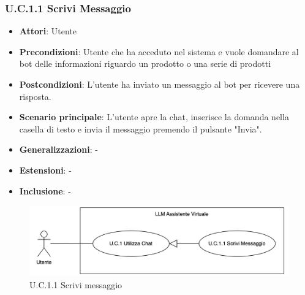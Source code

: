 \subsubsection{U.C.1.1 Scrivi Messaggio}
\begin{itemize}
    \item \textbf{Attori}: Utente
    \item \textbf{Precondizioni}: Utente che ha acceduto nel sistema e vuole domandare al bot delle informazioni riguardo un prodotto o una serie di prodotti
    \item \textbf{Postcondizioni}: L'utente ha inviato un messaggio al bot per ricevere una risposta.
    \item \textbf{Scenario principale}: L'utente apre la chat, inserisce la domanda nella casella di testo e invia il messaggio premendo il pulsante "Invia".
    \item \textbf{Generalizzazioni}: -
    \item \textbf{Estensioni}: -
    \item \textbf{Inclusione}: -
\end{itemize}
\begin{figure}[H]
    \centering
    \includegraphics[width=\textwidth]{img/UC1.1.png}
    \caption{U.C.1.1 Scrivi messaggio}
\end{figure}
\newpage

